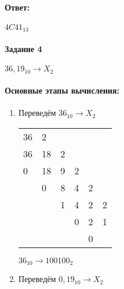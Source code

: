 \paragraph{Ответ:}
$4C41_{13}$

\paragraph{Задание 4}
$36,19_{10} \rightarrow X_{2}$
\paragraph{Основные этапы вычисления:}
\begin{enumerate}
\item Переведём $36_{10} \rightarrow X_{2}$

\FloatBarrier
\begin{table}[bh]
\centering
\begin{tabular}{llllll}
\multicolumn{1}{l|}{36} & 2                       &                        &                        &                        &    \\ 
\cline{2-2}
\multicolumn{1}{l|}{36} & \multicolumn{1}{l|}{18} & 2                      &                        &                        &    \\ 
\cline{1-1}\cline{3-3}
0                       & \multicolumn{1}{l|}{18} & \multicolumn{1}{l|}{9} & 2                      &                        &    \\ 
\cline{2-2}\cline{4-4}
                        & 0                       & \multicolumn{1}{l|}{8} & \multicolumn{1}{l|}{4} & 2                      &    \\ 
\cline{3-3}\cline{5-5}
                        &                         & 1                      & \multicolumn{1}{l|}{4} & \multicolumn{1}{l|}{2} & 2  \\ 
\cline{4-4}\cline{6-6}
                        &                         &                        & 0                      & \multicolumn{1}{l|}{2} & 1  \\ 
\cline{5-5}
                        &                         &                        &                        & 0                      &   
\end{tabular}
\end{table}
\FloatBarrier
$36_{10} \rightarrow 100100_{2}$
\item Переведём $0,19_{10} \rightarrow X_{2}$
\FloatBarrier
\begin{table}[bh]
\centering
\begin{tabular}{|l|l|llll}

\end{tabular}
\end{table}
\end{enumerate}

